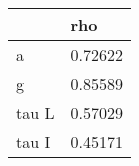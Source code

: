 \begin{tabular}{ll}
& rho \\ 
\hline 
a & 0.72622 \\ 
g & 0.85589 \\ 
tau L & 0.57029 \\ 
tau I & 0.45171 \\ 
\hline 
\end{tabular}